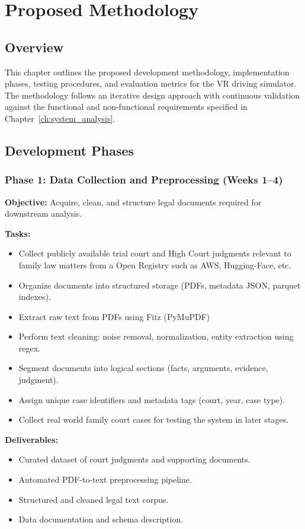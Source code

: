 \chapter{Proposed Methodology}
\label{ch:methodology}

\section{Overview}
This chapter outlines the proposed development methodology, implementation phases, testing procedures, and evaluation metrics for the VR driving simulator. The methodology follows an iterative design approach with continuous validation against the functional and non-functional requirements specified in Chapter~\ref{ch:system_analysis}.
\section{Development Phases}

\subsection{Phase 1: Data Collection and Preprocessing (Weeks 1--4)}
\textbf{Objective:} Acquire, clean, and structure legal documents required for downstream analysis.

\textbf{Tasks:}
\begin{itemize}
	\item Collect publicly available trial court and High Court judgments relevant to family law matters from a Open Registry such as AWS, Hugging-Face, etc.
	\item Organize documents into structured storage (PDFs, metadata JSON, parquet indexes).
	\item Extract raw text from PDFs using Fitz (PyMuPDF)
	\item Perform text cleaning: noise removal, normalization, entity extraction using regex.
	\item Segment documents into logical sections (facts, arguments, evidence, judgment).
	\item Assign unique case identifiers and metadata tags (court, year, case type).
	\item Collect real world family court cases for testing the system in later stages.
\end{itemize}

\textbf{Deliverables:}
\begin{itemize}
	\item Curated dataset of court judgments and supporting documents.
	\item Automated PDF-to-text preprocessing pipeline.
	\item Structured and cleaned legal text corpus.
	\item Data documentation and schema description.
\end{itemize}

